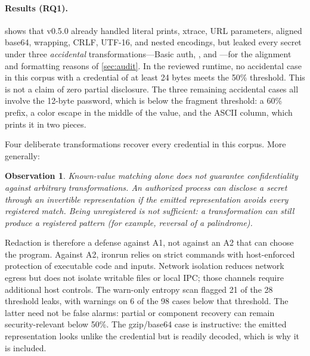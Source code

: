 \documentclass[10pt,twocolumn]{article}
\newcommand{\sys}{\textsf{ironrun}}
\newcommand{\code}[1]{\textup{\texttt{\detokenize{#1}}}}
\newtheorem{observation}{Observation}
\begin{document}
\paragraph{Results (RQ1).}  shows that v0.5.0 already handled
literal prints, xtrace, URL parameters, aligned base64, wrapping, CRLF,
UTF-16, and nested encodings, but leaked every secret under three
\emph{accidental} transformations---Basic auth, \code{printenv | base64}, and
\code{xxd}---for the alignment and formatting reasons of \cref{sec:audit}.
In the reviewed runtime, no accidental case in this corpus with a credential
of at least 24 bytes meets the 50\% threshold. This is not a claim of zero
partial disclosure. The three remaining accidental cases all involve the
12-byte password, which is below the fragment threshold: a 60\% prefix, a
color escape in the middle of the value, and the \code{xxd} ASCII column, which
prints it in two pieces.

Four deliberate transformations recover every credential in this corpus.
More generally:
\begin{observation}
\label{obs:arbitrary}
Known-value matching alone does not guarantee confidentiality against arbitrary
transformations. An authorized process can disclose a secret through an
invertible representation if the emitted representation avoids every registered
match. Being unregistered is not sufficient: a transformation can still produce
a registered pattern (for example, reversal of a palindrome).
\end{observation}
Redaction is therefore a defense against A1, not against an A2 that can choose
the program. Against A2, \sys{} relies on strict commands with host-enforced
protection of executable code and inputs. Network isolation reduces network
egress but does not isolate writable files or local IPC; those channels require
additional host controls. The warn-only entropy scan flagged
21 of the 28 threshold leaks, with warnings on 6 of the 98 cases below
that threshold. The latter need not be false alarms: partial or component
recovery can remain security-relevant below 50\%. The gzip/base64 case is
instructive: the emitted representation looks unlike the credential but is
readily decoded, which is why it is included.
\end{document}

